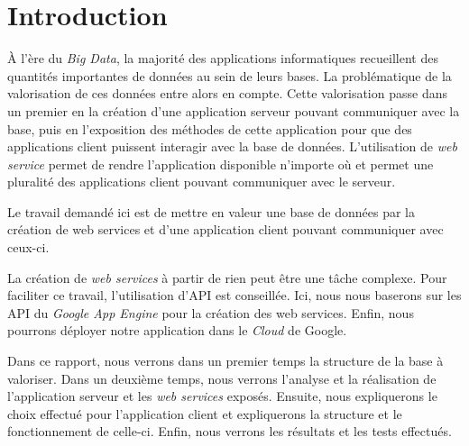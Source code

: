 \chapter{Introduction}

À l'ère du \textit{Big Data}, la majorité des applications informatiques recueillent des quantités importantes de données au sein de leurs bases. La problématique de la valorisation de ces données entre alors en compte. Cette valorisation passe dans un premier en la création d'une application serveur pouvant communiquer avec la base, puis en l'exposition des méthodes de cette application pour que des applications client puissent interagir avec la base de données.
L'utilisation de \textit{web service} permet de rendre l'application disponible n'importe où et permet une pluralité des applications client pouvant communiquer avec le serveur.

Le travail demandé ici est de mettre en valeur une base de données par la création de web services et d'une application client pouvant communiquer avec ceux-ci.

La création de \textit{web services} à partir de rien peut être une tâche complexe. Pour faciliter ce travail, l'utilisation d'API est conseillée. Ici, nous nous baserons sur les API du \textit{Google App Engine} pour la création des web services. Enfin, nous pourrons déployer notre application dans le \textit{Cloud} de Google.

Dans ce rapport, nous verrons dans un premier temps la structure de la base à valoriser. Dans un deuxième temps, nous verrons l'analyse et la réalisation de l'application serveur et les \textit{web services} exposés. Ensuite, nous expliquerons le choix effectué pour l'application client et expliquerons la structure et le fonctionnement de celle-ci. Enfin, nous verrons les résultats et les tests effectués.
